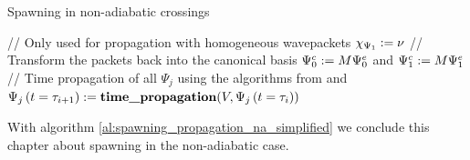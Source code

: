 \begin{chapter}{Spawning in non-adiabatic crossings}
\begin{algorithm}
\begin{algorithmic}
      \STATE // Only used for propagation with homogeneous wavepackets
      \STATE $\chi_{\Psi_1} := \nu$
      \STATE // Transform the packets back into the canonical basis
      \STATE $\Psi^c_0 := M \Psi^e_0$ and $\Psi^c_1 := M \Psi^e_1$
    \ENDIF
    \STATE // Time propagation of all $\Psi_j$ using the algorithms from \cite{FGL_semiclassical_dynamics} and \cite{BGH_natac}
       \STATE $\Psi_j\left( t=\tau_{i+1} \right) := \textbf{time\_propagation}(V, \Psi_j\left( t=\tau_i \right))$
    \ENDFOR
  \ENDFOR
\end{algorithmic}
\end{algorithm}

With algorithm \ref{al:spawning_propagation_na_simplified} we conclude this
chapter about spawning in the non-adiabatic case.

\end{chapter}
